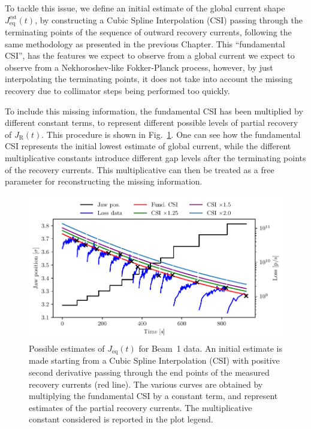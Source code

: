 To tackle this issue, we define an initial estimate of the global current shape $J_\text{eq}^{\text{est}}(t)$, by constructing a Cubic Spline Interpolation (CSI) passing through the terminating points of the sequence of outward recovery currents, following the same methodology as presented in the previous Chapter. This ``fundamental CSI'', has the features we expect to observe from a global current we expect to observe from a Nekhoroshev-like Fokker-Planck process, however, by just interpolating the terminating points, it does not take into account the missing recovery due to collimator steps being performed too quickly.

To include this missing information, the fundamental CSI has been multiplied by different constant terms, to represent different possible levels of partial recovery of $J_\mathrm{R}(t)$. This procedure is shown in Fig.~\ref{fig:second}. One can see how the fundamental CSI represents the initial lowest estimate of global current, while the different multiplicative constants introduce different gap levels after the terminating points of the recovery currents. This multiplicative can then be treated as a free parameter for reconstructing the missing information.

%
\begin{figure}[hpt]
    \centering
    \includegraphics[trim={0 2.5mm 0 3mm}, clip, width=\columnwidth]{5_Diffusion_measurement_LHC/figs/second_bis.pdf}
    \caption{Possible estimates of $J_\mathrm{eq}(t)$ for Beam~1 data. An initial estimate is made starting from a Cubic Spline Interpolation (CSI) with positive second derivative passing through the end points of the measured recovery currents (red line). The various curves are obtained by multiplying the fundamental CSI by a constant term, and represent estimates of the partial recovery currents. The multiplicative constant considered is reported in the plot legend.}
    \label{fig:second}
\end{figure}
%

